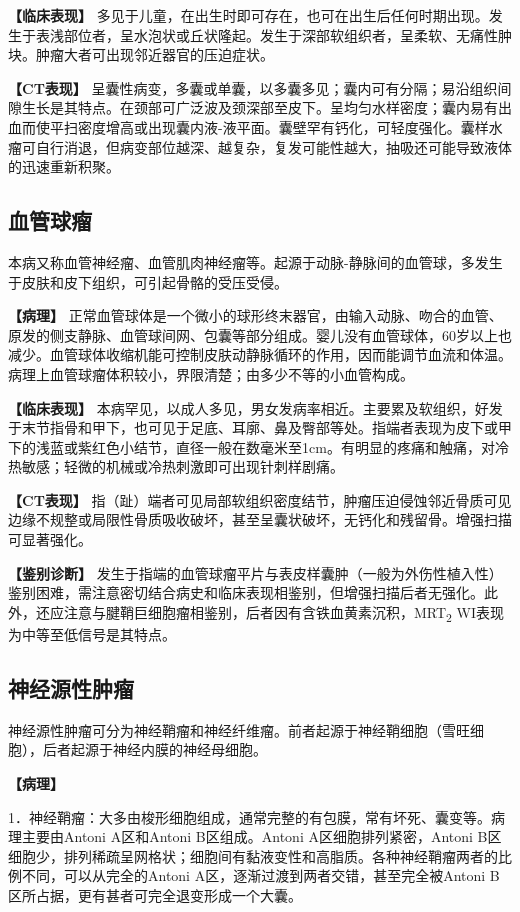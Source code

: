 \textbf{【临床表现】}
多见于儿童，在出生时即可存在，也可在出生后任何时期出现。发生于表浅部位者，呈水泡状或丘状隆起。发生于深部软组织者，呈柔软、无痛性肿块。肿瘤大者可出现邻近器官的压迫症状。

\textbf{【CT表现】}
呈囊性病变，多囊或单囊，以多囊多见；囊内可有分隔；易沿组织间隙生长是其特点。在颈部可广泛波及颈深部至皮下。呈均匀水样密度；囊内易有出血而使平扫密度增高或出现囊内液-液平面。囊壁罕有钙化，可轻度强化。囊样水瘤可自行消退，但病变部位越深、越复杂，复发可能性越大，抽吸还可能导致液体的迅速重新积聚。

\subsection{血管球瘤}

本病又称血管神经瘤、血管肌肉神经瘤等。起源于动脉-静脉间的血管球，多发生于皮肤和皮下组织，可引起骨骼的受压受侵。

\textbf{【病理】}
正常血管球体是一个微小的球形终末器官，由输入动脉、吻合的血管、原发的侧支静脉、血管球间网、包囊等部分组成。婴儿没有血管球体，60岁以上也减少。血管球体收缩机能可控制皮肤动静脉循环的作用，因而能调节血流和体温。病理上血管球瘤体积较小，界限清楚；由多少不等的小血管构成。

\textbf{【临床表现】}
本病罕见，以成人多见，男女发病率相近。主要累及软组织，好发于末节指骨和甲下，也可见于足底、耳廓、鼻及臀部等处。指端者表现为皮下或甲下的浅蓝或紫红色小结节，直径一般在数毫米至1cm。有明显的疼痛和触痛，对冷热敏感；轻微的机械或冷热刺激即可出现针刺样剧痛。

\textbf{【CT表现】}
指（趾）端者可见局部软组织密度结节，肿瘤压迫侵蚀邻近骨质可见边缘不规整或局限性骨质吸收破坏，甚至呈囊状破坏，无钙化和残留骨。增强扫描可显著强化。

\textbf{【鉴别诊断】}
发生于指端的血管球瘤平片与表皮样囊肿（一般为外伤性植入性）鉴别困难，需注意密切结合病史和临床表现相鉴别，但增强扫描后者无强化。此外，还应注意与腱鞘巨细胞瘤相鉴别，后者因有含铁血黄素沉积，MRT\textsubscript{2}
WI表现为中等至低信号是其特点。

\subsection{神经源性肿瘤}

神经源性肿瘤可分为神经鞘瘤和神经纤维瘤。前者起源于神经鞘细胞（雪旺细胞），后者起源于神经内膜的神经母细胞。

\textbf{【病理】}

1．神经鞘瘤：大多由梭形细胞组成，通常完整的有包膜，常有坏死、囊变等。病理主要由Antoni
A区和Antoni B区组成。Antoni A区细胞排列紧密，Antoni
B区细胞少，排列稀疏呈网格状；细胞间有黏液变性和高脂质。各种神经鞘瘤两者的比例不同，可以从完全的Antoni
A区，逐渐过渡到两者交错，甚至完全被Antoni
B区所占据，更有甚者可完全退变形成一个大囊。

